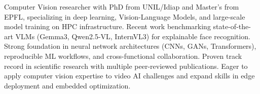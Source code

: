 


\begin{cvparagraph}
Computer Vision researcher with PhD from UNIL/Idiap and Master's from EPFL, specializing in deep learning, Vision-Language Models, and large-scale model training on HPC infrastructure. Recent work benchmarking state-of-the-art VLMs (Gemma3, Qwen2.5-VL, InternVL3) for explainable face recognition. Strong foundation in neural network architectures (CNNs, GANs, Transformers), reproducible ML workflows, and cross-functional collaboration. Proven track record in scientific research with multiple peer-reviewed publications. Eager to apply computer vision expertise to video AI challenges and expand skills in edge deployment and embedded optimization.
\end{cvparagraph}
